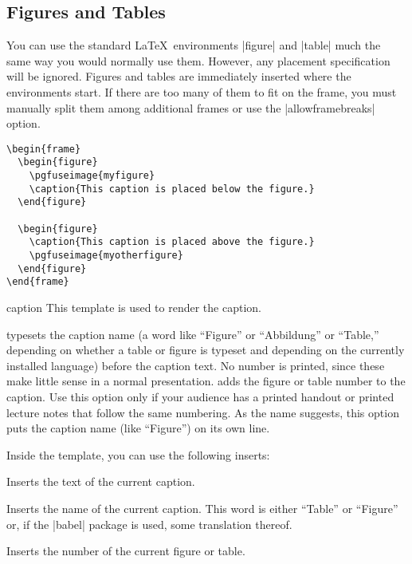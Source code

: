 \subsection{Figures and Tables}

You can use the standard \LaTeX\ environments |figure| and |table| much the same way you would normally use them. However, any placement specification will be ignored. Figures and tables are immediately inserted where the environments start. If there are too many of them to fit on the frame, you must manually split them among additional frames or use the |allowframebreaks| option.

\example
\begin{verbatim}
\begin{frame}
  \begin{figure}
    \pgfuseimage{myfigure}
    \caption{This caption is placed below the figure.}
  \end{figure}

  \begin{figure}
    \caption{This caption is placed above the figure.}
    \pgfuseimage{myotherfigure}
  \end{figure}
\end{frame}
\end{verbatim}

\begin{element}{caption}\yes\yes\yes
  This template is used to render the caption.
  \begin{templateoptions}
    typesets the caption name (a word like ``Figure'' or ``Abbildung'' or ``Table,'' depending on whether a table or figure is typeset and depending on the currently installed language) before the caption text. No number is printed, since these make little sense in a normal presentation.
    adds the figure or table number to the caption. Use this option only if your audience has a printed handout or printed lecture notes that follow the same numbering.
    As the name suggests, this option puts the caption name (like ``Figure'') on its own line.
  \end{templateoptions}

  Inside the template, you can use the following inserts:
  \begin{itemize}
    \iteminsert{\insertcaption}
    Inserts the text of the current caption.

    \iteminsert{\insertcaptionname}
    Inserts the name of the current caption. This word is either ``Table'' or ``Figure'' or, if the |babel| package is used, some translation thereof.

    \iteminsert{\insertcaptionnumber}
    Inserts the number of the current figure or table.
  \end{itemize}
\end{element}

